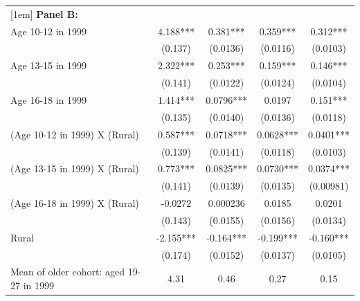 \documentclass[12pt,letterpaper]{article}
\newcommand{\0}{\ensuremath{\mbox{\boldmath $0$}}}
\begin{document}
\begin{table}[h!]
\begin{center}
{{\begin{tabular}{lcccc}
[1em]
{\textbf{Panel B:}}                         &                   &                       &                   &                   \\
Age 10-12 in 1999                            &       4.188***&       0.381***&       0.359***&       0.312***\\
                                            &     (0.137)         &    (0.0136)         &    (0.0116)         &    (0.0103)         \\
[1em]
Age 13-15 in 1999                            &       2.322***&       0.253***&       0.159***&       0.146***\\
                                            &     (0.141)         &    (0.0122)         &    (0.0124)         &    (0.0104)         \\
[1em]
Age 16-18 in 1999                           &       1.414***&      0.0796***&      0.0197         &       0.151***\\
                                            &     (0.135)         &    (0.0140)         &    (0.0136)         &    (0.0118)         \\
[1em]
(Age 10-12 in 1999) X (Rural)               &     0.587***&      0.0718***&      0.0628***&      0.0401***\\
                                            &     (0.139)         &    (0.0141)         &    (0.0118)         &    (0.0103)         \\
[1em]
(Age 13-15 in 1999) X (Rural)              &       0.773***&      0.0825***&      0.0730***&      0.0374***\\
                                            &     (0.141)         &    (0.0139)         &    (0.0135)         &   (0.00981)         \\
[1em]
(Age 16-18 in 1999) X (Rural)               &     -0.0272         &    0.000236         &      0.0185         &      0.0201         \\
                                             &     (0.143)         &    (0.0155)         &    (0.0156)         &    (0.0134)         \\
[1em]
Rural                                      &      -2.155***&      -0.164***&      -0.199***&      -0.160***\\
                                           &     (0.174)         &    (0.0152)         &    (0.0137)         &    (0.0105)         \\
\hline
Mean of older cohort: aged 19-27 in 1999                  &   4.31            &      0.46     &       0.27        &  0.15                         \\

\end{tabular}}}
\end{center}
\end{table}
\end{document}
